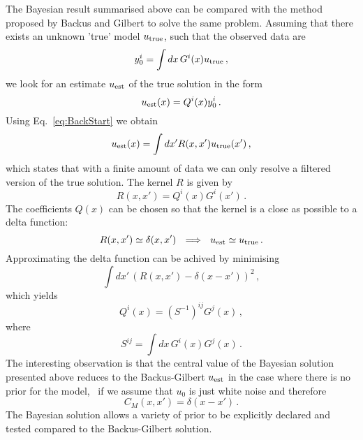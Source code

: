 The Bayesian result summarised above can be compared with the method proposed by Backus and Gilbert to solve the same problem. Assuming that there exists an unknown 'true' model $u_\mathrm{true}$, such that the observed data are
\begin{equation}
  \label{eq:BackStart}
  y_0^i = \int dx\, G^i(x) u_\mathrm{true}\, ,
\end{equation}
we look for an estimate $u_\mathrm{est}$ of the true solution in the form
\begin{equation}
  \label{eq:BackAnsatz}
  u_\mathrm{est}(x) = Q^i(x) y^i_0\, .
\end{equation}
Using Eq.~\ref{eq:BackStart} we obtain
\begin{equation}
  \label{eq:BackFilter}
  u_\mathrm{est}(x) = \int dx' R(x,x') u_\mathrm{true}(x')\, , 
\end{equation}
which states that with a finite amount of data we can only resolve a filtered
version of the true solution. The kernel $R$ is given by
\begin{equation}
  \label{eq:BackKernel}
  R(x,x') = Q^i(x) G^i(x')\, .
\end{equation}
The coefficients $Q(x)$ can be chosen so that the kernel is a close as possible
to a delta function:
\begin{equation}
  \label{eq:BackDelta}
  R(x,x') \simeq \delta(x,x') ~~ \Longrightarrow ~~
  u_\mathrm{est} \simeq u_\mathrm{true}\, .
\end{equation}
Approximating the delta function can be achived by minimising 
\begin{equation}
  \label{eq:BackDeltaness}
  \int dx'\, \left(
    R(x,x') - \delta(x-x')
  \right)^2\, ,
\end{equation}
which yields
\begin{equation}
  \label{eq:BackSolution}
  Q^i(x) = \left(S^{-1}\right)^{ij} G^j(x)\, ,
\end{equation}
where 
\begin{equation}
  \label{eq:BackSMatrix}
  S^{ij} = \int dx\, G^i(x) G^j(x)\, .
\end{equation}
The interesting observation is that the central value of the Bayesian solution
presented above reduces to the Backus-Gilbert $u_\mathrm{est}$ in the case where there is
no prior for the model, \ie\ if we assume that $u_0$ is just white noise and
therefore
\begin{equation}
  \label{eq:BackComparison}
  C_M(x,x') = \delta(x-x')\, .
\end{equation}
The Bayesian solution allows a variety of prior to be explicitly declared and
tested compared to the Backus-Gilbert solution. 